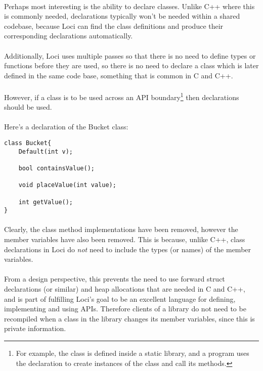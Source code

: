 \documentclass[12pt,twoside,notitlepage]{report}
\begin{document}
\paragraph{}
Perhaps most interesting is the ability to declare classes. Unlike C++ where this is commonly needed, declarations typically won't be needed within a shared codebase, because Loci can find the class definitions and produce their corresponding declarations automatically.

\paragraph{}
Additionally, Loci uses multiple passes so that there is no need to define types or functions before they are used, so there is no need to declare a class which is later defined in the same code base, something that is common in C and C++.

\paragraph{}
However, if a class is to be used across an API boundary\footnote{For example, the class is defined inside a static library, and a program uses the declaration to create instances of the class and call its methods.} then declarations should be used.

\paragraph{}
Here's a declaration of the Bucket class:

\small{
\begin{verbatim}
class Bucket{
    Default(int v);

    bool containsValue();
    
    void placeValue(int value);
    
    int getValue();
}
\end{verbatim}
}

\paragraph{}
Clearly, the class method implementations have been removed, however the member variables have also been removed. This is because, unlike C++, class declarations in Loci do \emph{not} need to include the types (or names) of the member variables.

\paragraph{}
From a design perspective, this prevents the need to use forward struct declarations (or similar) and heap allocations that are needed in C and C++, and is part of fulfilling Loci's goal to be an excellent language for defining, implementing and using APIs. Therefore clients of a library do not need to be recompiled when a class in the library changes its member variables, since this is private information.
\end{document}
